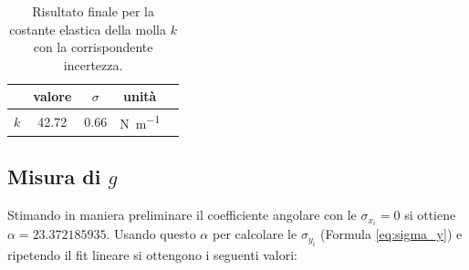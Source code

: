 \documentclass[titlepage]{article}
\numberwithin{equation}{section}
\numberwithin{figure}{section}
\numberwithin{table}{section}
\begin{document}
\begin{table}[ht]
  \centering
  \begin{tabular}{rcccc}
    \toprule
    & valore & $\sigma$ & unità \\
    \midrule
    $k$ & 42.72 & 0.66 & \si{\newton\per\metre} \\
    \bottomrule
  \end{tabular}
  \caption{Risultato finale per la costante elastica della molla $k$ con la corrispondente incertezza.}
\end{table}

\pagebreak
\subsection{Misura di \texorpdfstring{$g$}{g}}

Stimando in maniera preliminare il coefficiente angolare con le $\sigma_{x_i} = 0$ si ottiene $\alpha = 23.372185935$.
Usando questo $\alpha$ per calcolare le $\sigma_{y_i}$ (Formula \ref{eq:sigma_y}) e ripetendo il fit lineare si ottengono i seguenti valori:
\end{document}
